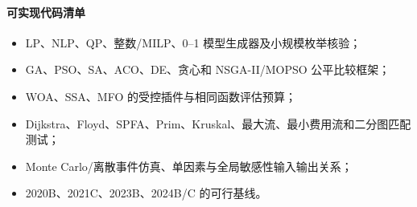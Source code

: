 \paragraph{可实现代码清单}
\begin{itemize}
  \item LP、NLP、QP、整数/MILP、0--1 模型生成器及小规模枚举核验；
  \item GA、PSO、SA、ACO、DE、贪心和 NSGA-II/MOPSO 公平比较框架；
  \item WOA、SSA、MFO 的受控插件与相同函数评估预算；
  \item Dijkstra、Floyd、SPFA、Prim、Kruskal、最大流、最小费用流和二分图匹配测试；
  \item Monte Carlo/离散事件仿真、单因素与全局敏感性输入输出关系；
  \item 2020B、2021C、2023B、2024B/C 的可行基线。
\end{itemize}


